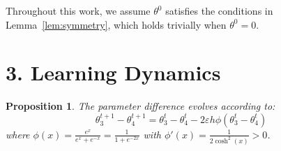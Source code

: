 \documentclass[11pt]{article}
\newtheorem{proposition}{Proposition}
\begin{document}
Throughout this work, we assume $\theta^0$ satisfies the conditions in Lemma~\ref{lem:symmetry}, which holds trivially when $\theta^0 = 0$.

\section*{3. Learning Dynamics}

\begin{proposition}
\label{prop:main-dynamics}
The parameter difference evolves according to:
\begin{equation}
\label{eq:gap-theta-update-1}
\boxed{\theta_3^{t+1} - \theta_4^{t+1} = \theta_3^t - \theta_4^t - 2\varepsilon h \phi(\theta_3^t - \theta_4^t)}
\end{equation}
where $\phi(x) = \frac{e^x}{e^x + e^{-x}} = \frac{1}{1 + e^{-2x}}$ with $\phi'(x) = \frac{1}{2\cosh^2(x)} > 0$.
\end{proposition}
\end{document}
